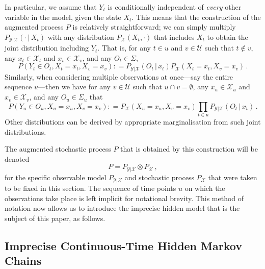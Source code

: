 \documentclass[twoside,11pt]{article}
\newcommand{\states}{\mathcal{X}}
\newcommand{\observs}{\mathcal{Y}}
\newcommand{\coloneqq}{:\!=}
\begin{document}
In particular, we assume that $Y_t$ is conditionally independent of \emph{every} other variable in the model, given the state $X_t$. This means that the construction of the augmented process $P$ is relatively straightforward; we can simply multiply $P_{\observs\vert\states}(\cdot\,\vert\,X_t)$ with any distribution $P_\states(X_t,\cdot)$ that includes $X_t$ to obtain the joint distribution including $Y_t$. That is, for any $t\in u$ and $v\in\mathcal{U}$ such that $t\notin v$, any $x_t\in\states_t$ and $x_v\in\states_v$, and any $O_t\in\Sigma$,
\begin{equation*}
P(Y_t\in O_t,X_t=x_t,X_v=x_v) \coloneqq P_{\observs\vert\states}(O_t\,\vert\,x_t)P_\states(X_t=x_t,X_v=x_v)\,.
\end{equation*}
Similarly, when considering multiple observations at once---say the entire sequence $u$---then we have for any $v\in\mathcal{U}$ such that $u\cap v=\emptyset$, any $x_u\in\states_u$ and $x_v\in\states_v$, and any $O_u\in\Sigma_u$ that
\begin{equation*}
P(Y_u\in O_u,X_u=x_u, X_v=x_v) \coloneqq P_\states(X_u=x_u,X_v=x_v)\prod_{t\in u} P_{\observs\vert\states}(O_{t}\,\vert\,x_{t})\,.
\end{equation*}
Other distributions can be derived by appropriate marginalisation from such joint distributions.

The augmented stochastic process $P$ that is obtained by this construction will be denoted
\begin{equation*}
P=P_{\observs\vert\states}\otimes P_\states\,,
\end{equation*}
for the specific observable model $P_{\observs\vert\states}$ and stochastic process $P_\states$ that were taken to be fixed in this section. The sequence of time points $u$ on which the observations take place is left implicit for notational brevity. This method of notation now allows us to introduce the imprecise hidden model that is the subject of this paper, as follows.

\subsection{Imprecise Continuous-Time Hidden Markov Chains}\label{subsec:ICTHMC}
\end{document}
